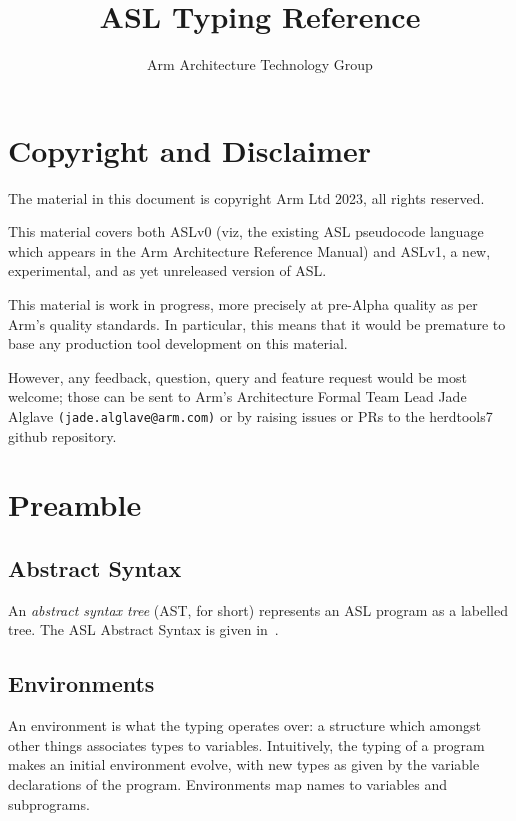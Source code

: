 \documentclass{book}
\author{Arm Architecture Technology Group}
\title{ASL Typing Reference}
\begin{document}
\maketitle

\tableofcontents{}

\chapter{Copyright and Disclaimer}

The material in this document is copyright Arm Ltd 2023, all rights reserved.

This material covers both ASLv0 (viz, the existing ASL pseudocode language
which appears in the Arm Architecture Reference Manual) and ASLv1, a new,
experimental, and as yet unreleased version of ASL.

This material is work in progress, more precisely at pre-Alpha quality as
per Arm’s quality standards. In particular, this means that it would be
premature to base any production tool development on this material.

However, any feedback, question, query and feature request would be most
welcome; those can be sent to Arm’s Architecture Formal Team Lead Jade
Alglave \texttt{(jade.alglave@arm.com)} or by raising issues or PRs to the herdtools7
github repository.

\chapter{Preamble}

\section{Abstract Syntax}
An \emph{abstract syntax tree} (AST, for short) represents an ASL program as a labelled tree. 
The ASL Abstract Syntax is given in~\cite{ASLAbstractSyntaxReference}.

\section{Environments}

An environment is what the typing operates over: a structure which amongst
other things associates types to variables. Intuitively, the typing of a
program makes an initial environment evolve, with new types as given by the
variable declarations of the program. Environments map names to variables and
subprograms.
\end{document}
